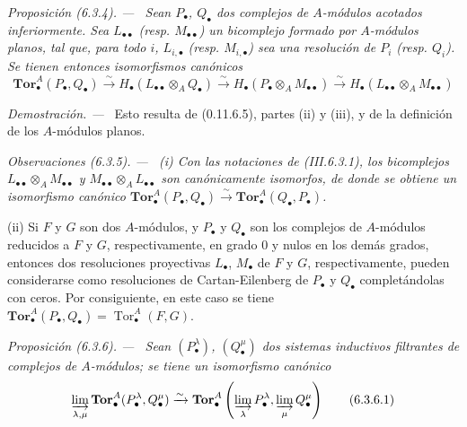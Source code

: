 \documentclass[10pt,oneside]{book}
\newcommand{\sref}[2][]{\textup{(#2)}}
\newenvironment{proposition}[1][]{\par\medskip\noindent\itshape Proposición (#1). ---\ }{\par}
\newenvironment{proof}{\par\medskip\noindent\textit{Demostración. ---\ }}{\par}
\newenvironment{namedtheorem}[2][]{\par\medskip\noindent\itshape #2 (#1). ---\ }{\par}
\begin{document}
\begin{proposition}[6.3.4]
\label{III.6.3.4}
Sean $P_\bullet$, $Q_\bullet$ dos complejos de $A$-módulos acotados
inferiormente. Sea $L_{\bullet\bullet}$ \textup{(resp. $M_{\bullet\bullet}$)} un
bicomplejo formado por $A$-módulos planos, tal que, para todo $i$,
$L_{i,\bullet}$ \textup{(resp. $M_{i,\bullet}$)} sea una resolución de $P_i$
\textup{(resp. $Q_i$)}. Se tienen entonces isomorfismos canónicos
\[
  \mathbf{Tor}_\bullet^A(P_\bullet,Q_\bullet)
  \xrightarrow{\sim}H_\bullet(L_{\bullet\bullet}\otimes_AQ_\bullet)
  \xrightarrow{\sim}H_\bullet(P_\bullet\otimes_AM_{\bullet\bullet})
  \xrightarrow{\sim}H_\bullet(L_{\bullet\bullet}\otimes_AM_{\bullet\bullet})
  \tag{6.3.4.1}\label{III.6.3.4.1}
\]
\end{proposition}

\begin{proof}
Esto resulta de \sref[0]{0.11.6.5}, partes (ii) y (iii), y de la definición
de los
$A$-módulos planos.
\end{proof}

\begin{namedtheorem}[6.3.5]{Observaciones}
\label{III.6.3.5}
(i) Con las notaciones de \sref{III.6.3.1}, los bicomplejos
$L_{\bullet\bullet}\otimes_A M_{\bullet\bullet}$ y
$M_{\bullet\bullet}\otimes_A L_{\bullet\bullet}$ son canónicamente
isomorfos, de donde se obtiene un isomorfismo canónico
$\mathbf{Tor}_\bullet^A(P_\bullet,Q_\bullet)\xrightarrow{\sim}
\mathbf{Tor}_\bullet^A(Q_\bullet,P_\bullet)$.

(ii) Si $F$ y $G$ son dos $A$-módulos, y $P_\bullet$ y $Q_\bullet$ son los
complejos de $A$-módulos reducidos a $F$ y $G$, respectivamente, en grado 0 y
nulos en los demás grados, entonces dos resoluciones proyectivas $L_\bullet$,
$M_\bullet$ de $F$ y $G$, respectivamente, pueden considerarse como
resoluciones de Cartan-Eilenberg de $P_\bullet$ y $Q_\bullet$ completándolas
con ceros. Por consiguiente, en este caso se tiene
$\mathbf{Tor}_\bullet^A(P_\bullet,Q_\bullet)
=\operatorname{Tor}_\bullet^A(F,G)$.
\end{namedtheorem}

\begin{proposition}[6.3.6]
\label{III.6.3.6}
Sean $(P_\bullet^\lambda)$, $(Q_\bullet^\mu)$ dos sistemas inductivos
filtrantes de complejos de $A$-módulos; se tiene un isomorfismo canónico
\[
  \varinjlim_{\lambda,\mu}
  \mathbf{Tor}_\bullet^A(P_\bullet^\lambda,Q_\bullet^\mu)
  \xrightarrow{\sim}
  \mathbf{Tor}_\bullet^A
  \left(\varinjlim_\lambda P_\bullet^\lambda,
        \varinjlim_\mu Q_\bullet^\mu\right)
  \tag{6.3.6.1}\label{III.6.3.6.1}
\]
\end{proposition}
\end{document}
